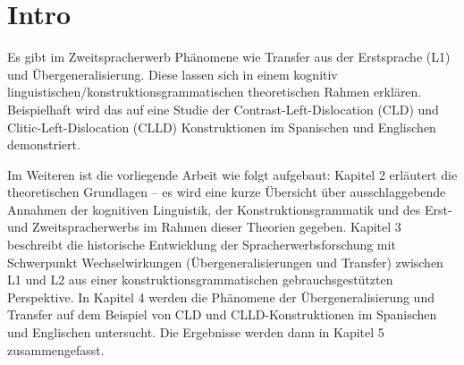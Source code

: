 \section{Intro}

\begin{comment}
* ca 3/4 Seiten
* Untersuchungsgegenstand
* Erkenntnisinteresse
* Forschungsstand
* Vorgehensweise: also Section 2 macht blabla, Section 3 blablup, ....
* Ergebnisse können/sollen angedeuten werden
\end{comment}


Es gibt im Zweitspracherwerb Phänomene wie Transfer aus der Erstsprache (L1) und Übergeneralisierung.
Diese lassen sich in einem kognitiv linguistischen/konstruktionsgrammatischen theoretischen Rahmen erklären.
Beispielhaft wird das auf eine Studie der Contrast-Left-Dislocation (CLD) und Clitic-Left-Dislocation (CLLD) Konstruktionen im Spanischen und Englischen demonstriert.

Im Weiteren ist die vorliegende Arbeit wie folgt aufgebaut:
Kapitel 2 erläutert die theoretischen Grundlagen -- es wird eine kurze Übersicht über ausschlaggebende Annahmen der kognitiven Linguistik, der Konstruktionsgrammatik und des Erst- und Zweitspracherwerbs im Rahmen dieser Theorien gegeben.
Kapitel 3 beschreibt die historische Entwicklung der Spracherwerbsforschung mit Schwerpunkt Wechselwirkungen (Übergeneralisierungen und Transfer) zwischen L1 und L2 aus einer konstruktionsgrammatischen gebrauchsgestützten Perspektive.
In Kapitel 4 werden die Phänomene der Übergeneralisierung und Transfer auf dem Beispiel von CLD und CLLD-Konstruktionen im Spanischen und Englischen untersucht.
Die Ergebnisse werden dann in Kapitel 5 zusammengefasst. %
